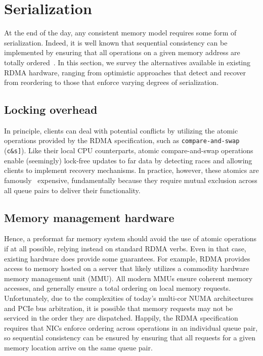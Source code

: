 \section{Serialization}

At the end of the day, any consistent memory model requires some form
of serialization.  Indeed, it is well known that sequential
consistency can be implemented by ensuring that all operations on a
given memory address are totally ordered~\cite{ivy}.  In this section,
we survey the alternatives available in existing RDMA hardware, ranging from optimistic approaches that detect and recover from reordering to those that enforce varying degrees of serialization.

\subsection{Locking overhead}

In principle, clients can deal with potential conflicts by utilizing
the atomic operations provided by the RDMA specification, such as
\texttt{compare-and-swap} (\texttt{c\&s]}).  Like their local CPU
  counterparts, atomic compare-and-swap operations enable (seemingly)
  lock-free updates to far data by detecting races and allowing
  clients to implement recovery mechanisms.  In practice, however,
  these atomics are famously~\cite{herd} expensive, fundamentally
  because they require mutual exclusion across all queue pairs to
  deliver their functionality.

\subsection{Memory management hardware}

Hence, a preformat far memory system should avoid the use of atomic
operations if at all possible, relying instead on standard RDMA verbs.
Even in that case, existing hardware does provide some guarantees.  For
example, RDMA provides access to memory hosted on a server that likely
utilizes a commodity hardware memory management unit (MMU).  All modern
MMUs ensure coherent memory accesses, and generally ensure a total
ordering on local memory requests.  Unfortunately, due to the
complexities of today's multi-cor NUMA architectures and PCIe bus
arbitration, it is possible that memory requests may not be serviced
in the order they are dispatched.  Happily, the RDMA specification
requires that NICs enforce ordering across operations in an
individual queue pair, so sequential consistency can be ensured by
ensuring that all requests for a given memory location arrive on the
same queue pair.



